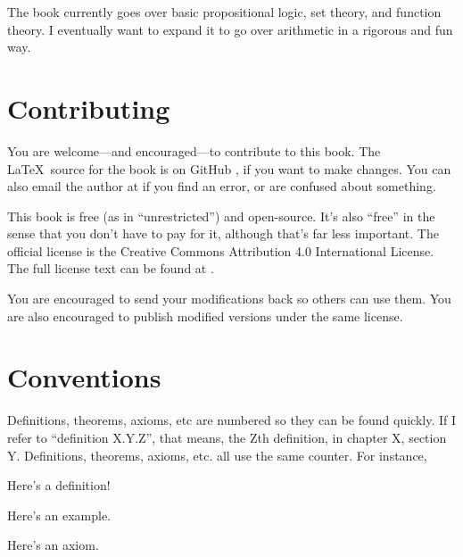 The book currently goes over basic propositional logic, set theory,
and function theory. I eventually want to expand it to go over
arithmetic in a rigorous and fun way.

\section{Contributing}

You are welcome---and encouraged---to contribute to this book. The
\LaTeX\ source for the book is on GitHub
, if you want to
make changes. You can also email the author at
 if you find an error, or are
confused about something.

This book is free (as in ``unrestricted'') and open-source. It's also
``free'' in the sense that you don't have to pay for it, although
that's far less important.  The official license is the Creative
Commons Attribution 4.0 International License. The full license text
can be found at
.

You are encouraged to send your modifications back so others can use
them. You are also encouraged to publish modified versions under the
same license.

\section{Conventions}

Definitions, theorems, axioms, etc are numbered so they can be found
quickly. If I refer to ``definition X.Y.Z'', that means, the Zth
definition, in chapter X, section Y. Definitions, theorems, axioms,
etc. all use the same counter. For instance,

\begin{definition}
  Here's a definition!
\end{definition}

\begin{example}
  Here's an example.
\end{example}

\begin{axiom}
  Here's an axiom.
\end{axiom}
